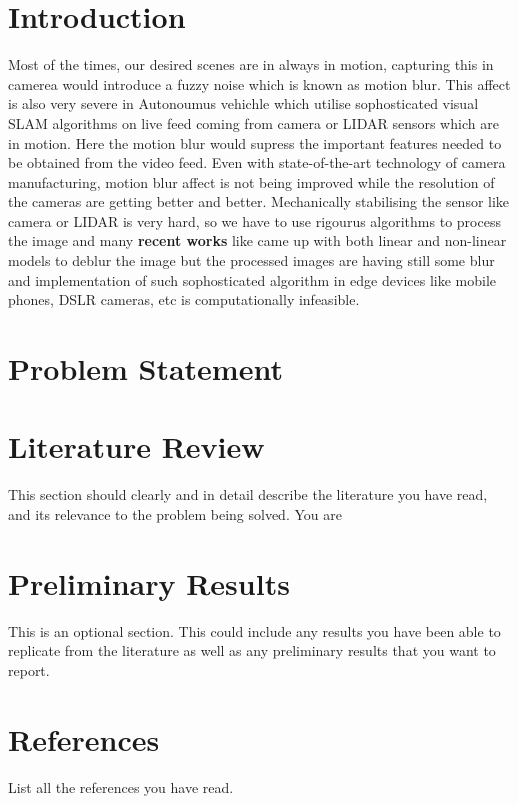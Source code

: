 \documentclass[10pt,twocolumn,letterpaper]{article}
\begin{document}
\section{Introduction}
\label{sec:intro}
%
Most of the times, our desired scenes are in always in motion, capturing this in camerea would introduce a fuzzy noise which is known as motion blur. This affect is also very severe in Autonoumus vehichle which utilise sophosticated visual SLAM algorithms on live feed coming from camera or LIDAR sensors which are in motion. Here the motion blur would supress the important features needed to be obtained from the video feed. Even with state-of-the-art technology of camera manufacturing, motion blur affect is not being improved while the resolution of the cameras are getting better and better.
Mechanically stabilising the sensor like camera or LIDAR is very hard, so we have to use rigourus algorithms to process the image and many \textbf{recent works} like {} came up with both linear and non-linear models to deblur the image but the processed images are having still some blur and implementation of such sophosticated algorithm in edge devices like mobile phones, DSLR cameras, etc is computationally infeasible.
\section{Problem Statement}
\label{sec:problem}


\section{Literature Review}
\label{sec:literature}
This section should clearly and in detail describe the literature you have read, and its relevance to the problem being solved. You are 

\section{Preliminary Results}
\label{sec:prelim_results}
This is an optional section. This could include any results you have been able to replicate from the literature as well as any preliminary results that you want to report.

\section{References}
List all the references you have read.

{\small


}
\end{document}
